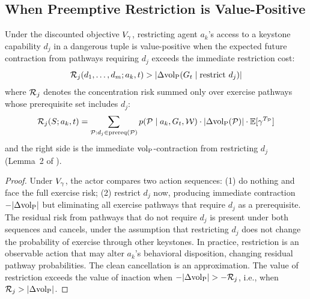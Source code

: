 \subsection{When Preemptive Restriction is Value-Positive}

\begin{proposition}
\label{prop:preemptive}
Under the discounted objective $V_\gamma$, restricting agent $a_k$'s access to
    a keystone capability $d_j$ in a dangerous tuple is value-positive when
    the expected future contraction from pathways requiring $d_j$ exceeds the
    immediate restriction cost:
\begin{equation}
\label{eq:preemptive}
\mathcal{R}_j(d_1, \ldots, d_m; a_k, t) > |\Delta {\operatorname{vol}_{\mathrm{P}}}(G_t \mid \text{restrict } d_j)|
\end{equation}
where $\mathcal{R}_j$ denotes the concentration risk summed only over exercise
    pathways whose prerequisite set includes $d_j$:
\begin{equation}
\label{eq:risk_j}
\mathcal{R}_j(S; a_k, t) = \sum_{\mathcal{P} : d_j \in \mathrm{prereq}(\mathcal{P})}
    p(\mathcal{P} \mid a_k, G_t, \mathcal{W}) \cdot |\Delta {\operatorname{vol}_{\mathrm{P}}}(\mathcal{P})|
    \cdot \mathbb{E}[\gamma^{T_{\mathcal{P}}}]
\end{equation}
and the right side is the immediate ${\operatorname{vol}_{\mathrm{P}}}$-contraction from restricting
    $d_j$ (Lemma~2 of \citet{lasser2026gfm}).
\end{proposition}

\begin{proof}
Under $V_\gamma$, the actor compares two action sequences: (1) do nothing
and face the full exercise risk; (2) restrict $d_j$ now, producing immediate
contraction $-|\Delta {\operatorname{vol}_{\mathrm{P}}}|$ but eliminating all exercise pathways that
require $d_j$ as a prerequisite. The residual risk from pathways that do not
require $d_j$ is present under both sequences and cancels, under the
assumption that restricting $d_j$ does not change the probability of
exercise through other keystones. In practice, restriction is an observable
action that may alter $a_k$'s behavioral disposition, changing residual
pathway probabilities. The clean cancellation is an approximation. The value of
restriction exceeds the value of inaction when
$-|\Delta {\operatorname{vol}_{\mathrm{P}}}| > -\mathcal{R}_j$, i.e., when $\mathcal{R}_j > |\Delta {\operatorname{vol}_{\mathrm{P}}}|$.
\end{proof}

